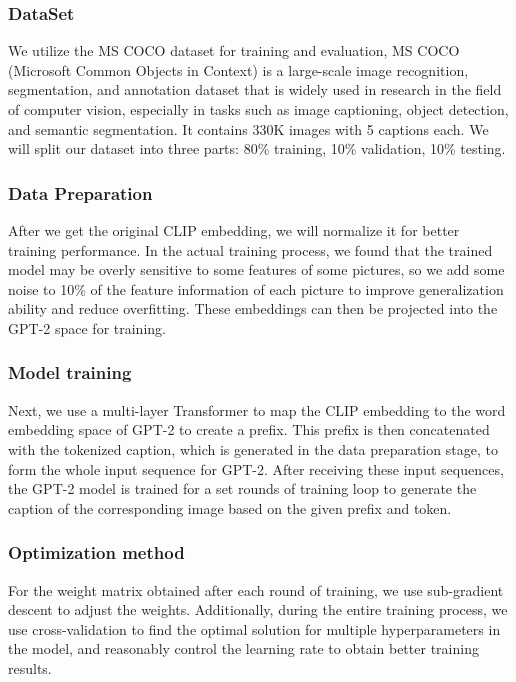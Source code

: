 \documentclass[11pt]{article}
\begin{document}
    \subsubsection{DataSet}

    We utilize the MS COCO dataset \cite{COCO}for training and evaluation, 
    MS COCO (Microsoft Common Objects in Context) 
    is a large-scale image recognition, segmentation, 
    and annotation dataset that is widely used in research 
    in the field of computer vision, especially in tasks 
    such as image captioning, object detection, and semantic 
    segmentation. It contains 330K images with 5 captions each. 
    We will split our dataset into three parts: 80\% training, 10\% validation, 10\% testing.

    \subsubsection{Data Preparation}
    After we get the original CLIP embedding, we will normalize it for better training performance. In the actual training process, 
    we found that the trained model may be overly sensitive to some features of some pictures, 
    so we add some noise to 10\% of the feature information of each picture to improve generalization ability and reduce overfitting. 
    These embeddings can then be projected into the GPT-2 space for training.
\pagebreak
    \subsubsection{Model training}
    Next, we use a multi-layer Transformer to map the 
    CLIP embedding to the word embedding space of GPT-2 
    to create a prefix. This prefix is then concatenated 
    with the tokenized caption, which is generated in the data preparation stage,  
    to form the whole input sequence for GPT-2. After receiving these input sequences, 
    the GPT-2 model is trained for a set rounds of training loop to generate the caption of the corresponding image based on the given prefix and token.

    \subsubsection{Optimization method}
    For the weight matrix obtained after each round of training, we use sub-gradient descent 
    to adjust the weights. Additionally, during the entire training process, we use cross-validation to 
    find the optimal solution for multiple hyperparameters in the model, and reasonably control the learning rate to obtain better training results.
\end{document}
